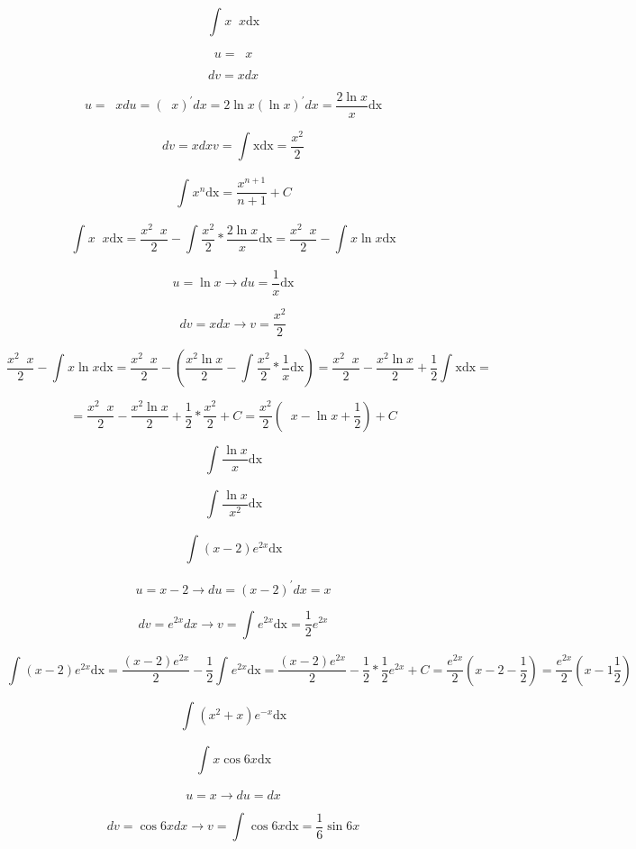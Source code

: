 \documentclass[]{article}
\date{}
\begin{document}
\[\int_{}^{}{x\operatorname{}x\text{dx}}\]

\[u = \operatorname{}x\]

\[dv = xdx\]

\[u = \operatorname{}xdu = ( \operatorname{}x )^{'}dx = 2\ln x( \ln x )^{'}dx = \frac{2\ln x}{x}\text{dx}\]

\[dv = xdxv = \int_{}^{}\text{xdx} = \frac{x^{2}}{2}\]

\[\int_{}^{}{x^{n}\text{dx}} = \frac{x^{n + 1}}{n + 1} + C\]

\[\int_{}^{}{x\operatorname{}x\text{dx}} = \frac{x^{2}\operatorname{}x}{2} - \int_{}^{}{\frac{x^{2}}{2} * \frac{2\ln x}{x}\text{dx}} = \frac{x^{2}\operatorname{}x}{2} - \int_{}^{}{x\ln x\text{dx}}\]

\[u = \ln x \rightarrow du = \frac{1}{x}\text{dx}\]

\[dv = xdx \rightarrow v = \frac{x^{2}}{2}\]

\[\frac{x^{2}\operatorname{}x}{2} - \int_{}^{}{x\ln x\text{dx}} = \frac{x^{2}\operatorname{}x}{2} - ( \frac{x^{2}\ln x}{2} - \int_{}^{}{\frac{x^{2}}{2} * \frac{1}{x}\text{dx}} ) = \frac{x^{2}\operatorname{}x}{2} - \frac{x^{2}\ln x}{2} + \frac{1}{2}\int_{}^{}\text{xdx} =\]

\[= \frac{x^{2}\operatorname{}x}{2} - \frac{x^{2}\ln x}{2} + \frac{1}{2} * \frac{x^{2}}{2} + C = \frac{x^{2}}{2}( \operatorname{}x - \ln x + \frac{1}{2} ) + C\]

\[\int_{}^{}{\frac{\ln x}{x}\text{dx}}\]

\[\int_{}^{}{\frac{\ln x}{x^{2}}\text{dx}}\]

\[\int_{}^{}{( x - 2 )e^{2x}\text{dx}}\]

\[u = x - 2 \rightarrow du = ( x - 2 )^{'}dx = x\]

\[dv = e^{2x}dx \rightarrow v = \int_{}^{}{e^{2x}\text{dx}} = \frac{1}{2}e^{2x}\]

\[\int_{}^{}{( x - 2 )e^{2x}\text{dx}} = \frac{( x - 2 )e^{2x}}{2} - \frac{1}{2}\int_{}^{}{e^{2x}\text{dx}} = \frac{( x - 2 )e^{2x}}{2} - \frac{1}{2} * \frac{1}{2}e^{2x} + C = \frac{e^{2x}}{2}( x - 2 - \frac{1}{2} ) = \frac{e^{2x}}{2}( x - 1\frac{1}{2} )\]

\[\int_{}^{}{( x^{2} + x )e^{- x}\text{dx}}\]

\[\int_{}^{}{x\cos{6x}\text{dx}}\]

\[u = x \rightarrow du = dx\]

\[dv = \cos{6x}dx \rightarrow v = \int_{}^{}{\cos{6x}\text{dx}} = \frac{1}{6}\sin{6x}\]
\end{document}
